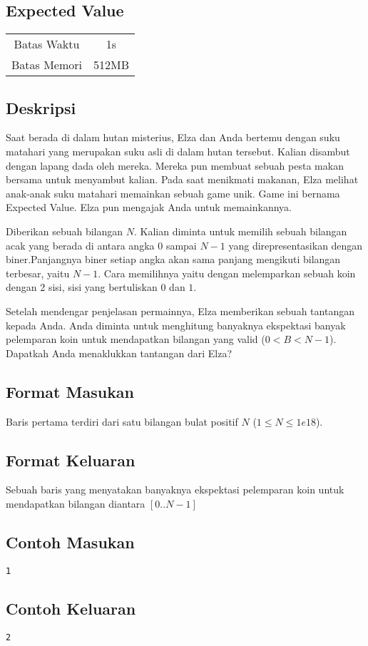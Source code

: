 \documentclass{article}
\begin{document}
\begin{center}
    \section*{Expected Value} %

    \begin{tabular}{ | c c | }
        \hline
        Batas Waktu  & 1s \\    %
        Batas Memori & 512MB \\  %
        \hline
    \end{tabular}
\end{center}

\subsection*{Deskripsi}
Saat berada di dalam hutan misterius, Elza dan Anda bertemu dengan suku matahari yang merupakan suku asli di dalam hutan tersebut.
Kalian disambut dengan lapang dada oleh mereka. Mereka pun membuat sebuah pesta makan bersama untuk menyambut kalian.
Pada saat menikmati makanan, Elza melihat anak-anak suku matahari memainkan sebuah game unik. Game ini bernama Expected Value. Elza pun
mengajak Anda untuk memainkannya.

Diberikan sebuah bilangan $N$. Kalian diminta untuk memilih sebuah bilangan acak yang berada di antara angka $0$ sampai $N-1$ yang 
direpresentasikan dengan biner.Panjangnya biner setiap angka akan sama panjang mengikuti bilangan terbesar, yaitu $N-1$.
Cara memilihnya yaitu dengan melemparkan sebuah koin dengan 2 sisi, sisi yang bertuliskan $0$ dan $1$.

Setelah mendengar penjelasan permainnya, Elza memberikan sebuah tantangan kepada Anda. Anda diminta untuk menghitung banyaknya 
ekspektasi banyak pelemparan koin untuk mendapatkan bilangan yang valid ($0 < B < N-1$). Dapatkah Anda menaklukkan tantangan dari Elza?

\subsection*{Format Masukan}
Baris pertama terdiri dari satu bilangan bulat positif $N$ ($1 \leq N \leq 1e18$).

\subsection*{Format Keluaran}
Sebuah baris yang menyatakan banyaknya ekspektasi pelemparan koin untuk mendapatkan bilangan diantara $[0..N-1]$
\\

\begin{multicols}{2}
\subsection*{Contoh Masukan}
\begin{lstlisting}
1
\end{lstlisting}
\columnbreak
\subsection*{Contoh Keluaran}
\begin{lstlisting}
2
\end{lstlisting}
\vfill
\null
\end{multicols}


\pagebreak
\end{document}
